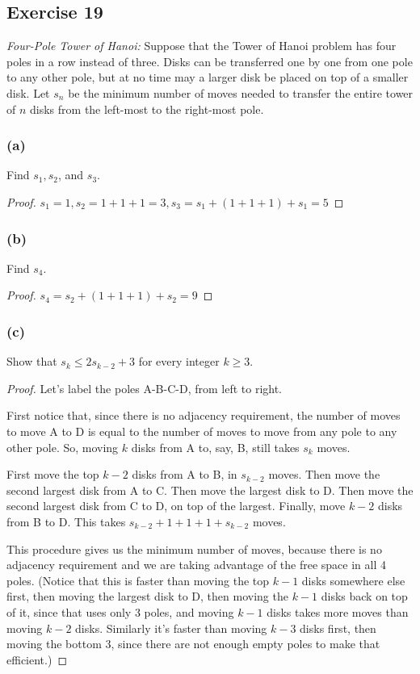 \documentclass[14pt]{extarticle}
\begin{document}
\subsection{Exercise 19}
{\it Four-Pole Tower of Hanoi:} Suppose that the Tower of Hanoi problem has four poles in a row instead of three. Disks can be transferred one by one from one pole to any other pole, but at no time may a larger disk be placed on top of a smaller disk. Let $s_n$ be the minimum number of moves needed to transfer the entire tower of $n$ disks from the left-most to the right-most pole.

\subsubsection{(a)}
Find $s_1, s_2$, and $s_3$.

\begin{proof}
$s_1 = 1, s_2 = 1 + 1 + 1 = 3, s_3 = s_1 + (1 + 1 + 1) + s_1 = 5$
\end{proof}

\subsubsection{(b)}
Find $s_4$.

\begin{proof}
$s_4 = s_2 + (1 + 1 + 1) + s_2 = 9$
\end{proof}

\subsubsection{(c)}
Show that $s_k \leq 2s_{k - 2} + 3$ for every integer $k \geq 3$.

\begin{proof}
Let's label the poles A-B-C-D, from left to right.

First notice that, since there is no adjacency requirement, the number of moves to move A to D is equal to the number 
of moves to move from any pole to any other pole. So, moving $k$ disks from A to, say, B, still takes $s_k$ moves.

First move the top $k-2$ disks from A to B, in $s_{k-2}$ moves. Then move the second largest disk from A to C. Then
move the largest disk to D. Then move the second largest disk from C to D, on top of the largest. Finally, move 
$k-2$ disks from B to D. This takes $s_{k-2} + 1 + 1 + 1 + s_{k-2}$ moves.

This procedure gives us the minimum number of moves, because there is no adjacency requirement and we are taking
advantage of the free space in all 4 poles. (Notice that this is faster than moving the top $k-1$ disks somewhere 
else first, then moving the largest disk to D, then moving the $k-1$ disks back on top of it, since that uses only 3 
poles, and moving $k-1$ disks takes more moves than moving $k-2$ disks. Similarly it's faster than moving $k-3$ disks
first, then moving the bottom 3, since there are not enough empty poles to make that efficient.)
\end{proof}
\end{document}

